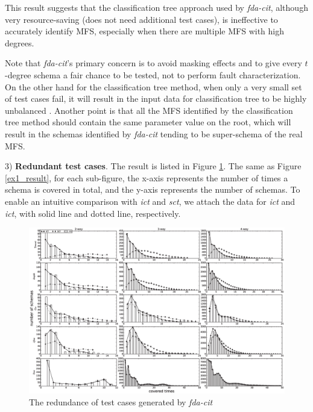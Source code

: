 \documentclass[10pt,journal,compsoc]{IEEEtran}
\begin{document}
This result suggests that the classification tree approach used by \emph{fda-cit}, although very resource-saving (does not need additional test cases),  is ineffective to accurately identify MFS, especially when there are multiple MFS with high degrees.

Note that \emph{fda-cit}'s primary concern is to avoid masking effects and to give every $t$-degree schema a fair chance to be tested, not to perform fault characterization. On the other hand for the classification tree method, when only a very small set of test cases fail, it will result in the input data for classification tree to be highly unbalanced \cite{zhang2012faulty}. Another point is that all the MFS identified by the classification tree method should contain the same parameter value on the root, which will result in the schemas identified by \emph{fda-cit} tending to be super-schema of the real MFS.

3) \textbf{Redundant test cases}.
The result is listed in Figure \ref{ex2_result}. The same as Figure \ref{ex1_result}, for each sub-figure, the x-axis represents the number of times a schema is covered in total, and the y-axis represents the number of schemas.  To enable an intuitive comparison with \emph{ict} and \emph{sct}, we attach the data for \emph{ict} and \emph{ict}, with solid line and dotted line, respectively.

\begin{figure}[htbp]
 \includegraphics[width=7.0in]{ex2.eps}
\caption{The redundance of test cases generated by \emph{fda-cit}}
\label{ex2_result}
\end{figure}
\end{document}
